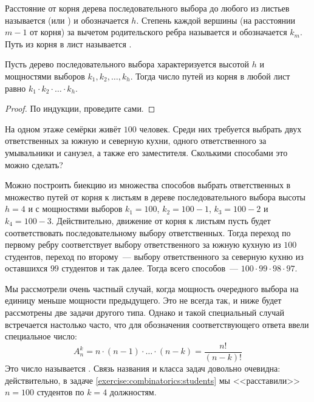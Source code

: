 \begin{definition}
    Расстояние от корня дерева последовательного выбора до любого из листьев называется  (или ) и обозначается $ h $.
    \newline
    Степень каждой вершины (на расстоянии $ m - 1 $ от корня) за вычетом родительского ребра называется  и обозначается $ k_m $.
    \newline
    Путь из корня в лист называется .
\end{definition}

\begin{statement}
    Пусть дерево последовательного выбора характеризуется высотой $ h $ и мощностями выборов $ k_1, k_2, \ldots, k_h $.
    Тогда число путей из корня в любой лист равно $ k_1 \cdot k_2 \cdot \ldots \cdot k_h $.
\end{statement}

\begin{proof}
    По индукции, проведите сами.
\end{proof}

\begin{Exercise}[counter=SecExercise, label={exercise:combinatorics:students}]
    \noindent
    На одном этаже семёрки живёт $ 100 $ человек.
    Среди них требуется выбрать двух ответственных за южную и северную кухни, одного ответственного за умывальники и санузел, а также его заместителя.
    Сколькими способами это можно сделать?
\end{Exercise}

\begin{Answer}
    \noindent
    Можно построить биекцию из множества способов выбрать ответственных в множество путей от корня к листьям в дереве последовательного выбора высоты $ h = 4 $
    и с мощностями выборов $ k_1 = 100 $, $ k_2 = 100 - 1 $, $ k_3 = 100 - 2 $ и $ k_4 = 100 - 3 $.
    Действительно, движение от корня к листьям пусть будет соответствовать последовательному выбору ответственных.
    Тогда переход по первому ребру соответствует выбору ответственного за южную кухную из $ 100 $ студентов, переход по второму~---
    выбору ответственного за северную кухню из оставшихся $ 99 $ студентов и так далее.
    Тогда всего способов~--- $ 100 \cdot 99 \cdot 98 \cdot 97 $.
\end{Answer}

Мы рассмотрели очень частный случай, когда мощность очередного выбора на единицу меньше мощности предыдущего.
Это не всегда так, и ниже будет рассмотрены две задачи другого типа.
Однако и такой специальный случай встречается настолько часто, что для обозначения соответствующего ответа ввели специальное число:
\[
    A_n^k = n \cdot (n-1) \cdot \ldots \cdot (n - k) = \frac{n!}{(n-k)!}
\]
Это число называется .
Связь названия и класса задач довольно очевидна: действительно, в задаче \ref{exercise:combinatorics:students} мы <<расставили>> $ n = 100 $ студентов по $ k = 4 $ должностям.

